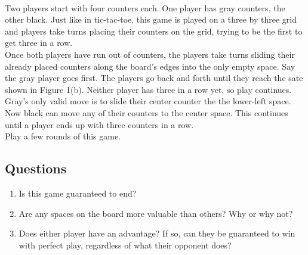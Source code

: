 \documentclass[12pt]{article}
\begin{document}
\begin{figure}[h]
    \\
    \caption{}
\end{figure}
\noindent Two players start with four counters each. One player has gray counters, the other black. Just like in tic-tac-toe, this game is played on a three by three grid and players take turns placing their counters on the grid, trying to be the first to get three in a row.\\

\noindent Once both players have run out of counters, the players take turns sliding their already placed counters along the board's edges into the only empty space. Say the gray player goes first. The players go back and forth until they reach the sate shown in Figure 1(b). Neither player has three in a row yet, so play continues. Gray's only valid move is to slide their center counter the the lower-left space. Now black can move any of their counters to the center space. This continues until a player ends up with three counters in a row.\\

\noindent Play a few rounds of this game.

\subsection*{Questions}
\begin{enumerate}
	\item Is this game guaranteed to end?
	\vspace{4cm}
	\item Are any spaces on the board more valuable than others? Why or why not?
	\vspace{4cm}
	\item Does either player have an advantage? If so, can they be guaranteed to win with perfect play, regardless of what their opponent does?
\end{enumerate}
\end{document}
